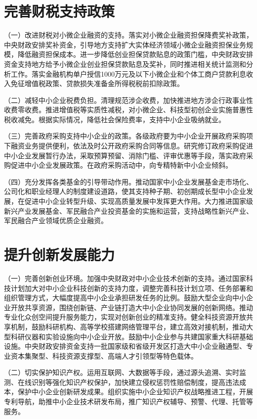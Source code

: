 \section{完善财税支持政策}

（一）改进财税对小微企业融资的支持。落实对小微企业融资担保降费奖补政策，中央财政安排奖补资金，引导地方支持扩大实体经济领域小微企业融资担保业务规模，降低融资担保成本。进一步降低创业担保贷款贴息的政策门槛，中央财政安排资金支持地方给予小微企业创业担保贷款贴息及奖补，同时推进相关统计监测和分析工作。落实金融机构单户授信1000万元及以下小微企业和个体工商户贷款利息收入免征增值税政策、贷款损失准备金所得税税前扣除政策。

（二）减轻中小企业税费负担。清理规范涉企收费，加快推进地方涉企行政事业性收费零收费。推进增值税等实质性减税，对小微企业、科技型初创企业实施普惠性税收减免。根据实际情况，降低社会保险费率，支持中小企业吸纳就业。

（三）完善政府采购支持中小企业的政策。各级政府要为中小企业开展政府采购项下融资业务提供便利，依法及时公开政府采购合同等信息。研究修订政府采购促进中小企业发展暂行办法，采取预算预留、消除门槛、评审优惠等手段，落实政府采购促进中小企业发展政策。在政府采购活动中，向专精特新中小企业倾斜。

（四）充分发挥各类基金的引导带动作用。推动国家中小企业发展基金走市场化、公司化和职业经理人的制度建设道路，使其支持种子期、初创期成长型中小企业发展，在促进中小企业转型升级、实现高质量发展中发挥更大作用。大力推进国家级新兴产业发展基金、军民融合产业投资基金的实施和运营，支持战略性新兴产业、军民融合产业领域优质企业融资。

\section{提升创新发展能力}

（一）完善创新创业环境。加强中央财政对中小企业技术创新的支持。通过国家科技计划加大对中小企业科技创新的支持力度，调整完善科技计划立项、任务部署和组织管理方式，大幅度提高中小企业承担研发任务的比例。鼓励大型企业向中小企业开放共享资源，围绕创新链、产业链打造大中小企业协同发展的创新网络。推动专业化众创空间提升服务能力，实现对创新创业的精准支持。健全科技资源开放共享机制，鼓励科研机构、高等学校搭建网络管理平台，建立高效对接机制，推动大型科研仪器和实验设施向中小企业开放。鼓励中小企业参与共建国家重大科研基础设施。中央财政安排资金支持一批国家级和省级开发区打造大中小企业融通型、专业资本集聚型、科技资源支撑型、高端人才引领型等特色载体。

（二）切实保护知识产权。运用互联网、大数据等手段，通过源头追溯、实时监测、在线识别等强化知识产权保护，加快建立侵权惩罚性赔偿制度，提高违法成本，保护中小企业创新研发成果。组织实施中小企业知识产权战略推进工程，开展专利导航，助推中小企业技术研发布局，推广知识产权辅导、预警、代理、托管等服务。

